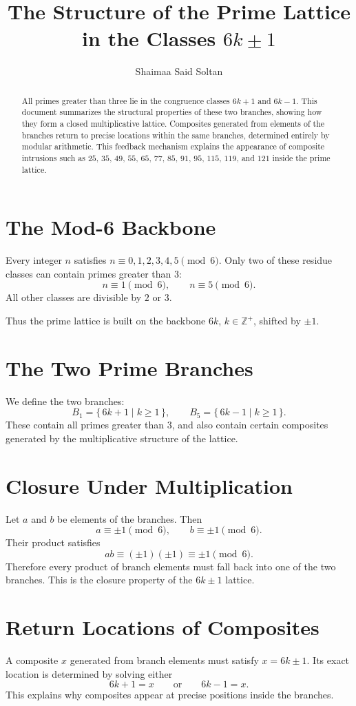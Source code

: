\documentclass[12pt]{article}
\title{The Structure of the Prime Lattice in the Classes $6k\pm1$}
\author{Shaimaa Said Soltan}
\date{}
\begin{document}
\maketitle

\begin{abstract}
All primes greater than three lie in the congruence classes $6k+1$ and $6k-1$.
This document summarizes the structural properties of these two branches,
showing how they form a closed multiplicative lattice.
Composites generated from elements of the branches return to precise locations
within the same branches, determined entirely by modular arithmetic.
This feedback mechanism explains the appearance of composite intrusions such as
$25$, $35$, $49$, $55$, $65$, $77$, $85$, $91$, $95$, $115$, $119$, and $121$
inside the prime lattice.
\end{abstract}

\section{The Mod-6 Backbone}
Every integer $n$ satisfies $n \equiv 0,1,2,3,4,5 \pmod{6}$. Only two of these
residue classes can contain primes greater than $3$:
\[
n \equiv 1 \pmod{6}, \qquad n \equiv 5 \pmod{6}.
\]
All other classes are divisible by $2$ or $3$.

Thus the prime lattice is built on the backbone $6k$, $k \in \mathbb{Z}^+$,
shifted by $\pm 1$.

\section{The Two Prime Branches}
We define the two branches:
\[
B_1 = \{\, 6k+1 \mid k \geq 1 \,\}, \qquad
B_5 = \{\, 6k-1 \mid k \geq 1 \,\}.
\]
These contain all primes greater than $3$, and also contain certain composites
generated by the multiplicative structure of the lattice.

\section{Closure Under Multiplication}
Let $a$ and $b$ be elements of the branches. Then
\[
a \equiv \pm 1 \pmod{6}, \qquad b \equiv \pm 1 \pmod{6}.
\]
Their product satisfies
\[
ab \equiv (\pm 1)(\pm 1) \equiv \pm 1 \pmod{6}.
\]
Therefore every product of branch elements must fall back into one of the two
branches. This is the closure property of the $6k \pm 1$ lattice.

\section{Return Locations of Composites}
A composite $x$ generated from branch elements must satisfy $x = 6k \pm 1$.
Its exact location is determined by solving either
\[
6k+1 = x \qquad \text{or} \qquad 6k-1 = x.
\]
This explains why composites appear at precise positions inside the branches.
\end{document}
